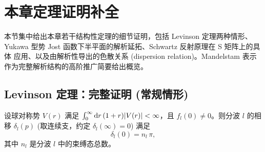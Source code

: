 \section{本章定理证明补全}\label{sec:anlyt-proofs}

本节集中给出本章若干结构性定理的细节证明，包括 Levinson 定理两种情形、
Yukawa 型势 Jost 函数下半平面的解析延拓、Schwartz 反射原理在 S 矩阵上的具体
应用、以及由解析性导出的色散关系 (dispersion relation)。Mandelstam 表示
作为完整解析结构的高阶推广简要给出概览。

\subsection{Levinson 定理：完整证明 (常规情形)}\label{ssec:anlyt-levinson-regular}

\begin{theorem*}
设球对称势 $V(r)$ 满足
$\int_0^\infty\mathrm{d} r\,(1+r)|V(r)|<\infty$，且 $f_l(0)\neq 0$。则分波 $l$ 的相移
$\delta_l(p)$ (取连续支，约定 $\delta_l(\infty)=0$) 满足
\begin{equation}
\delta_l(0) = n_l\,\pi,
\label{eq:anlyt-levinson-main}
\end{equation}
其中 $n_l$ 是分波 $l$ 中的束缚态总数。
\end{theorem*}


